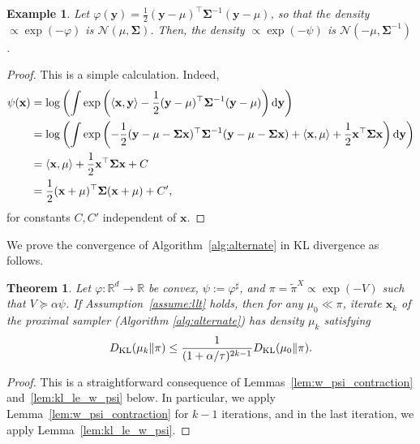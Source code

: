 \documentclass[11pt]{article}
\newtheorem{theorem}{Theorem}
\newtheorem{example}{Example}
\newcommand{\defeq}{:=}
\newcommand{\inprod}[2]{\left\langle#1, #2\right\rangle}
\newcommand{\R}{\mathbb{R}}
\newcommand{\dd}{\textup{d}}
\newcommand{\Par}[1]{\left(#1\right)}
\newcommand{\0}{\mathbf{0}}
\newcommand{\1}{\mathbf{1}}
\newcommand{\vx}{\mathbf{x}}
\newcommand{\vy}{\mathbf{y}}
\newcommand{\msig}{\boldsymbol{\Sigma}}
\newcommand{\calN}{\mathcal{N}}
\newcommand{\vhi}{\varphi}
\newcommand{\dkl}{D_{\textup{KL}}}
\newcommand{\tpi}{\tilde{\pi}}
\begin{document}
\begin{example}\label{ex:llt_gaussian}
    Let $\vhi(\vy) = \frac{1}{2}(\vy-\mu)^\top\msig^{-1}(\vy-\mu)$, so that the density $\propto \exp(-\vhi)$ is $\calN(\mu,\msig)$. Then, the density $\propto \exp(-\psi)$ is $\calN(-\mu,\msig^{-1})$.
\end{example}
\begin{proof}
    This is a simple calculation. Indeed, \begin{align*}
        \psi(\vx) &= \log\Par{\int\exp\Par{\inprod{\vx}{\vy}-\frac{1}{2}(\vy-\mu)^\top \msig^{-1}(\vy-\mu)}\dd\vy}\\
        &= \log\Par{\int\exp\Par{-\frac{1}{2}(\vy-\mu-\msig\vx)^\top \msig^{-1}(\vy-\mu-\msig\vx)+\inprod{\vx}{\mu}+\frac{1}{2}\vx^\top\msig\vx}\dd\vy}\\
        &=\inprod{\vx}{\mu}+\frac{1}{2}\vx^\top\msig\vx+C\\
        &=\frac{1}{2}(\vx+\mu)^\top\msig(\vx+\mu)+C',
    \end{align*}
    for constants $C,C'$ independent of $\vx$.
\end{proof}



We prove the convergence of Algorithm~\ref{alg:alternate} in KL divergence as follows.

\begin{theorem}\label{thm:under-conjecture}
Let $\vhi: \R^d \to \R$ be convex, $\psi \defeq \vhi^\sharp$, and $\pi=\tpi^X \propto \exp(-V)$ such that $V \succeq \alpha\psi$.  If Assumption~\ref{assume:llt} holds, then for any $\mu_0\ll \pi$, iterate $\vx_k$ of the proximal sampler (Algorithm \ref{alg:alternate}) has density $\mu_k$ satisfying
    \[
        \dkl(\mu_k \|\pi) \le \frac{1}{(1 + \alpha/\tau)^{2k-1}}\dkl(\mu_0\|\pi).
    \]
\end{theorem}
\begin{proof}
    This is a straightforward consequence of Lemmas~\ref{lem:w_psi_contraction} and~\ref{lem:kl_le_w_psi} below. In particular, we apply Lemma~\ref{lem:w_psi_contraction} for $k - 1$ iterations, and in the last iteration, we apply Lemma~\ref{lem:kl_le_w_psi}.
\end{proof}
\end{document}

